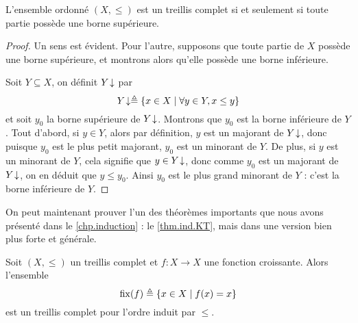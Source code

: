 \begin{property}
  L'ensemble ordonné $(X,\leq)$ est un treillis complet si et seulement si toute
  partie possède une borne supérieure.
\end{property}

\begin{proof}
  Un sens est évident. Pour l'autre, supposons que toute partie de $X$ possède
  une borne supérieure, et montrons alors qu'elle possède une borne inférieure.

  Soit $Y\subseteq X$, on définit $Y\!\downarrow$ par
  \[Y\!\downarrow \triangleq \{x\in X \mid \forall y \in Y, x \leq y\}\]
  et soit $y_0$ la borne supérieure de $Y\!\downarrow$. Montrons que $y_0$ est la
  borne inférieure de $Y$. Tout d'abord, si $y\in Y$, alors par définition,
  $y$ est un majorant de $Y\!\downarrow$, donc puisque $y_0$ est le plus petit
  majorant, $y_0$ est un minorant de $Y$. De plus, si $y$ est un minorant
  de $Y$, cela signifie que $y\in Y\!\downarrow$, donc comme $y_0$ est un majorant
  de $Y\!\downarrow$, on en déduit que $y\leq y_0$. Ainsi $y_0$ est le plus grand
  minorant de $Y$ : c'est la borne inférieure de $Y$.
\end{proof}

On peut maintenant prouver l'un des théorèmes importants que nous avons présenté
dans le \cref{chp.induction} : le \cref{thm.ind.KT}, mais dans une version bien
plus forte et générale.

\begin{theorem}
  Soit $(X,\leq)$ un treillis complet et $f : X \to X$ une fonction croissante.
  Alors l'ensemble
  \[\operatorname{fix}(f) \triangleq \{x\in X \mid f(x) = x\}\]
  est un treillis complet pour l'ordre induit par $\leq$.
\end{theorem}


